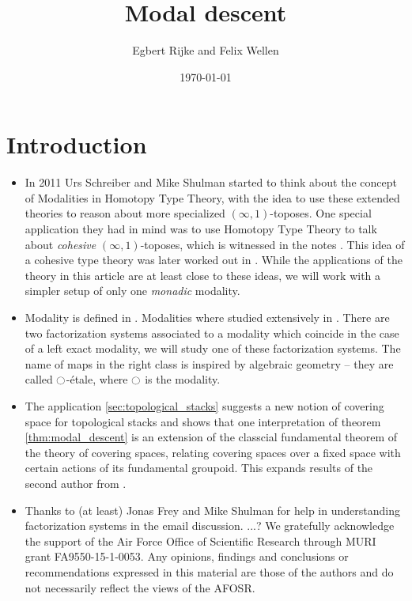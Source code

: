 \documentclass[9pt,twosided]{amsart}
\title{Modal descent}
\author{Egbert Rijke and Felix Wellen}
\date{\today}
\begin{document}
\maketitle

\section{Introduction}
\begin{itemize}
\item In 2011 Urs Schreiber and Mike Shulman started to think about the concept of Modalities in Homotopy Type Theory,
  with the idea to use these extended theories to reason about more specialized $(\infty,1)$-toposes.
  One special application they had in mind was to use Homotopy Type Theory to talk about \emph{cohesive} $(\infty,1)$-toposes,
  which is witnessed in the notes \cite{ShulmanSchreiber}.
  This idea of a cohesive type theory was later worked out in \cite{ShulmanRealCohesion}.
  While the applications of the theory in this article are at least close to these ideas,
  we will work with a simpler setup of only one \emph{monadic} modality.
\item Modality is defined in \cite[Section 7.7]{UFP}.
  Modalities where studied extensively in \cite{RijkeSpittersShulman}.
  There are two factorization systems associated to a modality which coincide in the case of a left exact modality,
  we will study one of these factorization systems. The name of maps in the right class is inspired by algebraic geometry -- they are called ${\ocircle}$-étale,
  where ${\ocircle}$ is the modality.
\item The application \ref{sec:topological_stacks} suggests a new notion of covering space for topological stacks and shows that
  one interpretation of theorem \ref{thm:modal_descent} is an extension of the classcial fundamental theorem of the theory of covering spaces,
  relating covering spaces over a fixed space with certain actions of its fundamental groupoid.
  This expands results of the second author from \cite{wellen-oxford-abstract}.
\item Thanks to (at least) Jonas Frey and Mike Shulman for help in understanding factorization systems in the email discussion.
  ...?
We gratefully acknowledge the support of the Air Force Office of Scientific Research through MURI grant FA9550-15-1-0053. Any opinions, findings and conclusions or recommendations expressed in this material are those of the authors and do not necessarily reflect the views of the AFOSR.
\end{itemize}
\end{document}
